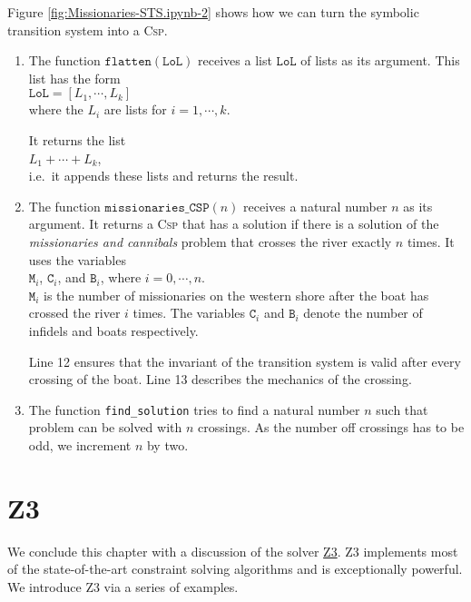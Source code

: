 Figure \ref{fig:Missionaries-STS.ipynb-2} shows how we can turn the symbolic transition system into a
\textsc{Csp}.
\begin{enumerate}
\item The function $\texttt{flatten}(\texttt{LoL})$ receives a list $\texttt{LoL}$ of lists as its argument.
       This list has the form
       \\[0.2cm]
       \hspace*{1.3cm}
       $\texttt{LoL} = [L_1, \cdots, L_k]$
       \\[0.2cm]
       where the $L_i$ are lists for $i=1,\cdots,k$.
       
       It returns the list
       \\[0.2cm]
       \hspace*{1.3cm}
       $L_1 + \cdots + L_k$,
       \\[0.2cm]
       i.e.~it appends these lists and returns the result.
\item The function $\mathtt{missionaries\_CSP}(n)$ receives a natural number $n$ as its argument.
       It returns a \textsc{Csp} that has a solution if there is a solution of the \emph{missionaries and cannibals}
       problem that crosses the river exactly $n$ times.  It uses the variables
       \\[0.2cm]
       \hspace*{1.3cm}
       $\mathtt{M}_i$, $\mathtt{C}_i$, and $\mathtt{B}_i$, where $i=0,\cdots,n$.
       \\[0.2cm]
       $\mathtt{M}_i$ is the number of missionaries on the western shore after the boat has crossed the river
       $i$ times. The variables $\mathtt{C}_i$ and $\texttt{B}_i$ denote the number of infidels and boats
       respectively.

       Line 12 ensures that the invariant of the transition system is valid after every crossing of the boat.
       Line 13 describes the mechanics of the crossing.
\item The function \texttt{find\_solution} tries to find a natural number $n$ such that problem can be solved
       with $n$ crossings. As the number off crossings has to be odd, we increment $n$ by two.
\end{enumerate}


\section{Z3}
We conclude this chapter with a discussion of the solver
\href{https://www.microsoft.com/en-us/research/project/z3-3/}{Z3}.  
Z3 implements most of the state-of-the-art constraint solving algorithms and is exceptionally powerful.  We
introduce Z3 via a series of examples.


